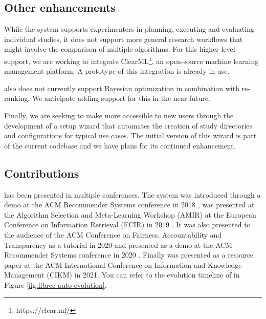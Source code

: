 \subsection{Other enhancements}

While the system supports experimenters in planning, executing and evaluating individual studies, it does not support more general research workflows that might involve the comparison of multiple algorithms. For this higher-level support, we are working to integrate ClearML\footnote{https://clear.ml/}, an open-source machine learning management platform. A prototype of this integration is already in use.

\libauto{} also does not currently support Bayesian optimization in combination with re-ranking. We anticipate adding support for this in the near future.  

Finally, we are seeking to make \libauto{} more accessible to new users through the development of a setup wizard that automates the creation of study directories and configurations for typical use cases. The initial version of this wizard is part of the current codebase and we have plans for its continued enhancement. 


\subsection{Contributions}

\libauto{} has been presented in multiple conferences. The system was introduced through a demo at the ACM Recommender Systems conference in 2018 \cite{mansoury2018automating}, was presented at the Algorithm Selection and Meta-Learning Workshop (AMIR) at the European Conference on Information Retrieval (ECIR) in 2019 \cite{mansoury2019algorithm}. It was also presented to the audience of the ACM Conference on Fairness, Accountability and Transparency as a tutorial in 2020 \cite{burke2020facct_libauto} and presented as a demo at the ACM Recommender Systems conference in 2020 \cite{Sonboli2020FARLA}. Finally \libauto{} was presented as a resource paper at the ACM International Conference on Information and Knowledge Management (CIKM) in 2021. You can refer to the evolution timeline of \libauto{} in Figure \ref{fig:librec-auto-evolution}.



